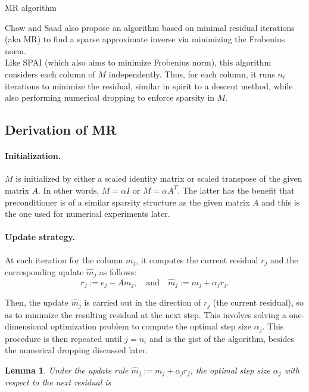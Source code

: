 \documentclass[paper=A4, fontsize=11pt]{scrartcl}
\newtheorem{lemma}{Lemma}[section]
\theoremstyle{remark}
\begin{document}
\begin{section}{MR algorithm}
	
	Chow and Saad \cite{chow} also propose an algorithm based on minimal residual iterations (aka MR) to find a sparse approximate inverse via minimizing the Frobenius norm.\\
	
	Like SPAI \cite{grote} (which also aims to minimize Frobenius norm), this algorithm considers each column of $M$ independently. Thus, for each column, it runs $n_{i}$ iterations to minimize the residual, similar in spirit to a descent method, while also performing numerical dropping to enforce sparsity in $M$. 
	
	\subsection{Derivation of MR}
	
	\paragraph{Initialization.}
	$M$ is initialized by either a scaled identity matrix or scaled transpose of the given matrix $A$. In other words, $M = \alpha I$ or $M =\alpha A^{T}$. The latter has the benefit that preconditioner is of a similar sparsity structure as the given matrix $A$ and this is the one used for numerical experiments later.  
	
	\paragraph{Update strategy.}
	At each iteration for the column $m_{j}$, it computes the current residual $r_j$ and the corresponding update  $\hat{m}_{j}$ as follows:
	\begin{equation}
	r_{j} :=e_{j}-A m_{j}, \quad \text{and} \quad \hat{m}_{j} :=m_{j}+\alpha_{j} r_{j}.
	\end{equation}

	Then, the update $\hat{m}_{j}$ is carried out in the direction of $r_j$ (the current residual), so as to minimize the resulting residual at the next step. This involves solving a one-dimensional optimization problem to compute the optimal step size $\alpha_{j}$. This procedure is then repeated until $j = n_{i}$ and  is the gist of the algorithm, besides the numerical dropping discussed later. 
	
	\begin{lemma}
Under the update rule $\hat{m}_{j} :=m_{j}+\alpha_{j} r_{j}$, 	the optimal step size $\alpha_{j}$ with respect to the next residual is 
	

\end{lemma}
\end{section}
\end{document}
